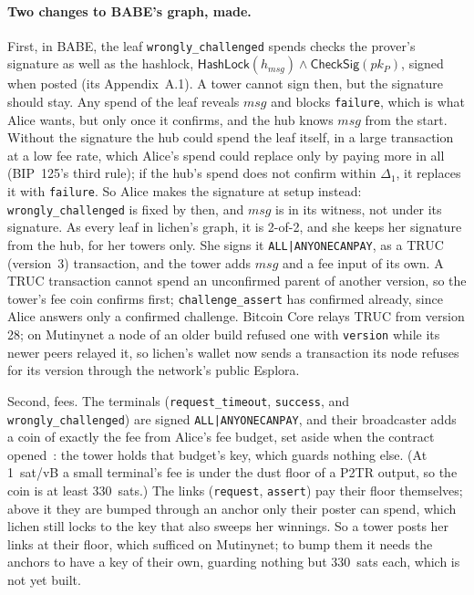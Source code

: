 \documentclass[11pt]{article}
\newcommand{\tx}[1]{\texttt{#1}}
\begin{document}
\paragraph{Two changes to BABE's graph, made.} First, in BABE, the leaf
\tx{wrongly\_challenged} spends checks the prover's signature as well as
the hashlock, $\mathsf{HashLock}(h_{\mathit{msg}}) \wedge
\mathsf{CheckSig}(pk_P)$, signed when posted (its Appendix~A.1). A
tower cannot sign then, but the signature should stay. Any spend of the
leaf reveals $\mathit{msg}$ and blocks \tx{failure}, which is what Alice
wants, but only once it confirms, and the hub knows $\mathit{msg}$ from
the start. Without the signature the hub could spend the leaf itself,
in a large transaction at a low fee rate, which Alice's spend could
replace only by paying more in all (BIP~125's third rule); if the hub's
spend does not confirm within $\Delta_1$, it replaces it with
\tx{failure}. So Alice makes the signature at setup instead:
\tx{wrongly\_challenged} is fixed by then, and $\mathit{msg}$ is in its
witness, not under its signature. As every leaf in lichen's graph, it is
2-of-2, and she keeps her signature from the hub, for her towers only.
She signs it \texttt{ALL|ANYONECANPAY}, as a TRUC (version~3)
transaction, and the tower adds $\mathit{msg}$ and a fee input of its
own. A TRUC transaction cannot spend an unconfirmed parent of another
version, so the tower's fee coin confirms first; \tx{challenge\_assert}
has confirmed already, since Alice answers only a confirmed challenge.
Bitcoin Core relays TRUC from version 28; on Mutinynet a node of an older
build refused one with \texttt{version} while its newer peers relayed
it, so lichen's wallet now sends a transaction its node refuses for its
version through the network's public Esplora.

Second, fees. The terminals (\tx{request\_timeout}, \tx{success}, and
\tx{wrongly\_challenged}) are signed \texttt{ALL|ANYONECANPAY}, and
their broadcaster adds a coin of exactly the fee from Alice's fee
budget, set aside when the contract opened~\cite[\S 6]{lichenbitvmx}:
the tower holds that budget's key, which guards nothing else. (At
1~sat/vB a small terminal's fee is under the dust floor of a P2TR
output, so the coin is at least 330~sats.) The links (\tx{request},
\tx{assert}) pay their floor themselves; above it they are bumped
through an anchor only their poster can spend, which lichen still locks
to the key that also sweeps her winnings. So a tower posts her links at
their floor, which sufficed on Mutinynet; to bump them it needs the
anchors to have a key of their own, guarding nothing but 330~sats each,
which is not yet built.
\end{document}
